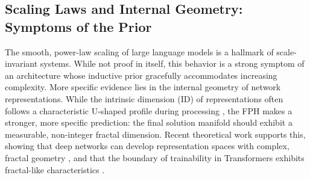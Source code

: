 \documentclass[11pt,a4paper]{article}
\begin{document}
\subsection{Scaling Laws and Internal Geometry: Symptoms of the Prior}
The smooth, power-law scaling of large language models \citep{kaplan2020scaling} is a hallmark of scale-invariant systems. While not proof in itself, this behavior is a strong symptom of an architecture whose inductive prior gracefully accommodates increasing complexity. More specific evidence lies in the internal geometry of network representations. While the intrinsic dimension (ID) of representations often follows a characteristic U-shaped profile during processing \citep{ansuini2019intrinsic}, the FPH makes a stronger, more specific prediction: the final solution manifold should exhibit a measurable, non-integer fractal dimension. Recent theoretical work supports this, showing that deep networks can develop representation spaces with complex, fractal geometry \citep{simmaco2025fractal}, and that the boundary of trainability in Transformers exhibits fractal-like characteristics \citep{torkamandi2025mapping}.
\end{document}
